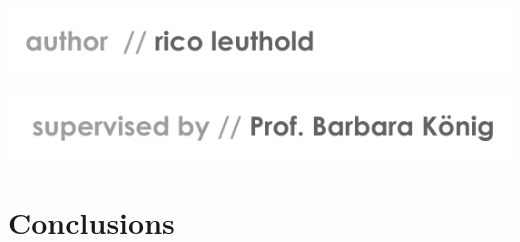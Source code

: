 \documentclass[a4paper,10pt,twoside,headings=small,bibliography=totocnumbered,headsepline]{scrartcl}
\begin{document}
\begin{titlepage}
\begin{minipage}{0.5\textwidth}
	\begin{flushleft}
		\includegraphics[width=\textwidth]{assets/pdf/title_footer_author.pdf}
	\end{flushleft}
\end{minipage}
\begin{minipage}{0.5\textwidth}
	\begin{flushright}
		\includegraphics[width=\textwidth]{assets/pdf/title_footer_supervisor.pdf}
	\end{flushright}
\end{minipage}
\end{titlepage}

\newpage

\tableofcontents
\listoftables
\listoffigures















\newpage
\section{Conclusions}
\label{sec:concl}
\end{document}
